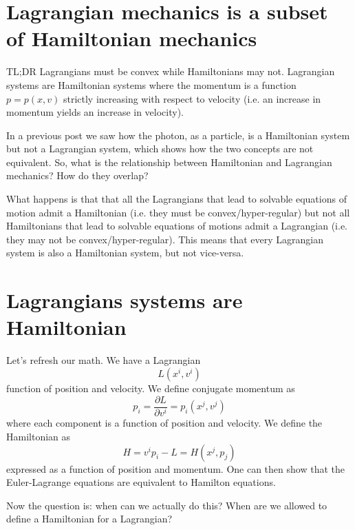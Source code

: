 \documentclass[aps,pra,10pt,floatfix,nofootinbib]{revtex4-1}
\theoremstyle{definition}
\begin{document}
	
\section{Lagrangian mechanics is a subset of Hamiltonian mechanics}

TL;DR Lagrangians must be convex while Hamiltonians may not. Lagrangian systems are Hamiltonian systems where the momentum is a function $p=p(x,v)$ strictly increasing with respect to velocity (i.e. an increase in momentum yields an increase in velocity).

In a previous post we saw how the photon, as a particle, is a Hamiltonian system but not a Lagrangian system, which shows how the two concepts are not equivalent. So, what is the relationship between Hamiltonian and Lagrangian mechanics? How do they overlap?

What happens is that that all the Lagrangians that lead to solvable equations of motion admit a Hamiltonian (i.e. they must be convex/hyper-regular) but not all Hamiltonians that lead to solvable equations of motions admit a Lagrangian (i.e. they may not be convex/hyper-regular). This means that every Lagrangian system is also a Hamiltonian system, but not vice-versa.


\section{Lagrangians systems are Hamiltonian}

Let's refresh our math. We have a Lagrangian
\begin{equation}
\label{Lagrangian}
L(x^i,v^i)
\end{equation} 
function of position and velocity. We define conjugate momentum as
\begin{equation}
\label{MomentumFromLagrangian}
p_i = \frac{\partial L}{\partial v^i} = p_i(x^j,v^j)
\end{equation}
where each component is a function of position and velocity. We define the Hamiltonian as
\begin{equation}
\label{HamiltonianFromLagrangian}
H = v^i p_i - L = H(x^j, p_j)
\end{equation}
expressed as a function of position and momentum. One can then show that the Euler-Lagrange equations are equivalent to Hamilton equations.

Now the question is: when can we actually do this? When are we allowed to define a Hamiltonian for a Lagrangian?
\end{document}
